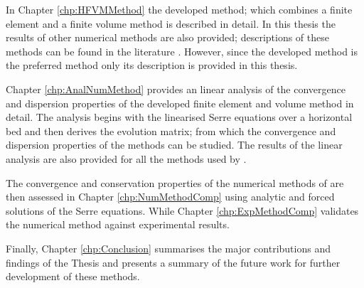 In Chapter \ref{chp:HFVMMethod} the developed method; which combines a finite element and a finite volume method is described in detail. In this thesis the results of other numerical methods are also provided; descriptions of these methods can be found in the literature \cite{Zoppou-etal-2017,Pitt-2018-61}. However, since the developed method is the preferred method only its description is provided in this thesis. 

Chapter \ref{chp:AnalNumMethod} provides an linear analysis of the convergence and dispersion properties of the developed finite element and volume method in detail. The analysis begins with the linearised Serre equations over a horizontal bed and then derives the evolution matrix; from which the convergence and dispersion properties of the methods can be studied. The results of the linear analysis are also provided for all the methods used by \citet{Pitt-2018-61}.

The convergence and conservation properties of the numerical methods of \citet{Pitt-2018-61} are then assessed in Chapter \ref{chp:NumMethodComp} using analytic and forced solutions of the Serre equations. While Chapter \ref{chp:ExpMethodComp} validates the numerical method against experimental results.

Finally, Chapter \ref{chp:Conclusion} summarises the major contributions and findings of the Thesis and presents a summary of the future work for further development of these methods. 


